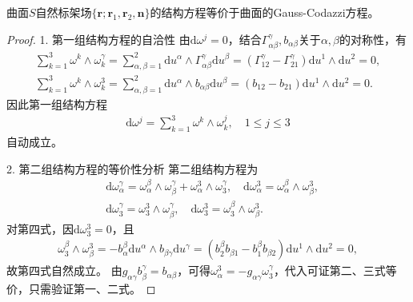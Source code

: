 \documentclass[../../main.tex]{subfiles}%
\begin{document}
\begin{proposition}
曲面$S$自然标架场$\{\boldsymbol{r};\boldsymbol{r}_1,\boldsymbol{r}_2,\boldsymbol{n}\}$的结构方程等价于曲面的Gauss-Codazzi方程。
\end{proposition}

\begin{proof}

1. 第一组结构方程的自洽性
由$\mathrm{d}\omega^j=0$，结合$\Gamma^\gamma_{\alpha\beta},b_{\alpha\beta}$关于$\alpha,\beta$的对称性，有
\begin{align*}
\sum_{k=1}^3\omega^k\wedge\omega^\gamma_k=\sum_{\alpha,\beta=1}^2\mathrm{d}u^\alpha\wedge\Gamma^\gamma_{\alpha\beta}\mathrm{d}u^\beta=(\Gamma^\gamma_{12}-\Gamma^\gamma_{21})\mathrm{d}u^1\wedge\mathrm{d}u^2=0,\\
\sum_{k=1}^3\omega^k\wedge\omega^3_k=\sum_{\alpha,\beta=1}^2\mathrm{d}u^\alpha\wedge b_{\alpha\beta}\mathrm{d}u^\beta=(b_{12}-b_{21})\mathrm{d}u^1\wedge\mathrm{d}u^2=0.
\end{align*}
因此第一组结构方程
\begin{align*}
\mathrm{d}\omega^j=\sum_{k=1}^3\omega^k\wedge\omega^j_k,\quad 1\leqslant j\leqslant3
\end{align*}
自动成立。

2. 第二组结构方程的等价性分析
第二组结构方程为
\begin{align*}
&\mathrm{d}\omega^\gamma_\alpha=\omega^\beta_\alpha\wedge\omega^\gamma_\beta+\omega^3_\alpha\wedge\omega^\gamma_3,\quad \mathrm{d}\omega^3_\alpha=\omega^\beta_\alpha\wedge\omega^3_\beta,\\
&\mathrm{d}\omega^\gamma_3=\omega^3_3\wedge\omega^\gamma_\beta,\quad \mathrm{d}\omega^3_3=\omega^\beta_3\wedge\omega^3_\beta.
\end{align*}
对第四式，因$\mathrm{d}\omega^3_3=0$，且
\begin{align*}
\omega^\beta_3\wedge\omega^3_\beta=-b^\beta_\alpha\mathrm{d}u^\alpha\wedge b_{\beta\gamma}\mathrm{d}u^\gamma=(b_2^\beta b_{\beta1}-b_1^\beta b_{\beta2})\mathrm{d}u^1\wedge\mathrm{d}u^2=0,
\end{align*}
故第四式自然成立。
由$g_{\alpha\gamma}b^\gamma_\beta=b_{\alpha\beta}$，可得$\omega^3_\alpha=-g_{\alpha\gamma}\omega^\gamma_3$，代入可证第二、三式等价，只需验证第一、二式。


\end{proof}
\end{document}
